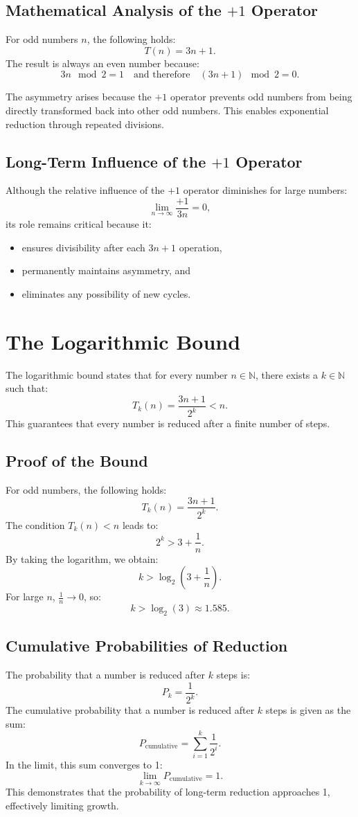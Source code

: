 \documentclass[a4paper,12pt]{article}
\begin{document}
\subsection{Mathematical Analysis of the \(+1\) Operator}
For odd numbers \( n \), the following holds:
\[
T(n) = 3n + 1.
\]
The result is always an even number because:
\[
3n \mod 2 = 1 \quad \text{and therefore} \quad (3n + 1) \mod 2 = 0.
\]

The asymmetry arises because the \(+1\) operator prevents odd numbers from being directly transformed back into other odd numbers. This enables exponential reduction through repeated divisions.

\subsection{Long-Term Influence of the \(+1\) Operator}
Although the relative influence of the \(+1\) operator diminishes for large numbers:
\[
\lim_{n \to \infty} \frac{+1}{3n} = 0,
\]
its role remains critical because it:
\begin{itemize}
    \item ensures divisibility after each \( 3n+1 \) operation,
    \item permanently maintains asymmetry, and
    \item eliminates any possibility of new cycles.
\end{itemize}

\section{The Logarithmic Bound}
The logarithmic bound states that for every number \( n \in \mathbb{N} \), there exists a \( k \in \mathbb{N} \) such that:
\[
T_k(n) = \frac{3n + 1}{2^k} < n.
\]
This guarantees that every number is reduced after a finite number of steps. 

\subsection{Proof of the Bound}
For odd numbers, the following holds:
\[
T_k(n) = \frac{3n + 1}{2^k}.
\]
The condition \( T_k(n) < n \) leads to:
\[
2^k > 3 + \frac{1}{n}.
\]
By taking the logarithm, we obtain:
\[
k > \log_2(3 + \frac{1}{n}).
\]
For large \( n \), \( \frac{1}{n} \to 0 \), so:
\[
k > \log_2(3) \approx 1.585.
\]

\subsection{Cumulative Probabilities of Reduction}
The probability that a number is reduced after \( k \) steps is:
\[
P_k = \frac{1}{2^k}.
\]
The cumulative probability that a number is reduced after \( k \) steps is given as the sum:
\[
P_{\text{cumulative}} = \sum_{i=1}^k \frac{1}{2^i}.
\]
In the limit, this sum converges to 1:
\[
\lim_{k \to \infty} P_{\text{cumulative}} = 1.
\]
This demonstrates that the probability of long-term reduction approaches 1, effectively limiting growth.
\end{document}
